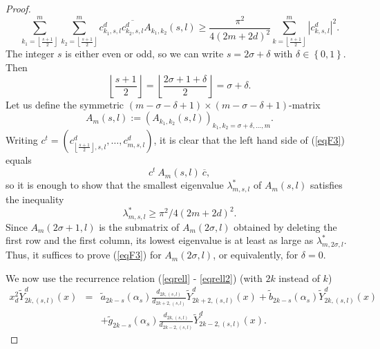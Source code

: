 \documentclass[10pt,a4paper]{amsart}
\begin{document}
\begin{proof}
\begin{equation}
\sum_{k_{1}=\left\lfloor \frac{s+1}{2}\right\rfloor }^{m}\sum_{k_{2}=\left\lfloor \frac{s+1}{2}%
\right\rfloor }^{m}c^d_{k_{1},s,l}\overline{c^d_{k_{2},s,l}}A_{k_{1},k_{2 }}\left(
s,l\right) 
\geq
 \frac{\pi ^{2}}{4\left( 2m + 2d  \right) ^{2}}\sum_{k=\left\lfloor 
\frac{s+1}{2}\right\rfloor }^{m}\left\vert c^d_{k,s,l}\right\vert ^{2}.  \label{eqF3}
\end{equation}
 The integer $s$ is either even or odd,
so we can write $s=2\sigma +\delta $ with $\delta \in \left\{ 0,1\right\}.$ 
Then 
\begin{equation*}
\left\lfloor \frac{s+1}{2}\right\rfloor =\left\lfloor \frac{2\sigma +1+\delta }{2}\right\rfloor
=\sigma +\delta .
\end{equation*}%
Let us define the symmetric $\left( m-\sigma -\delta +1\right) \times \left(
m-\sigma -\delta +1\right) $-matrix 
\begin{equation*}
A_{m}\left( s,l\right) :=\left( A_{k_{1},k_{2}}\left( s,l\right) \right)
_{k_{1},k_{2}=\sigma +\delta ,\dots , m}.
\end{equation*}
Writing $c^t = \left(c^d_{\left\lfloor \frac{s +1}{2}\right\rfloor, s,l}, \dots,  c^d_{m,s,l}\right)$, it is clear that the left hand side of (\ref{eqF3}) equals 
$$
c^t \ A_m(s,l) \ \overline{c},
$$
so it is enough to show that  the  smallest eigenvalue $\lambda _{m, s,l}^{\ast }$  of
 $A_m \left( s,l\right) $
satisfies the inequality 
$$
\lambda _{m, s,l}^{\ast }
\ge
\pi ^{2}/4\left( 2m+2d\right) ^{2}.
$$
Since $A_{m}\left( 2\sigma +1,l\right) $ is the submatrix of $A_{m}\left(
2\sigma ,l\right)$ obtained by deleting the first row and the first column, its lowest eigenvalue is at least as large as $\lambda _{m, 2\sigma,l}^{\ast }$. Thus, it suffices to prove (\ref{eqF3}) for $
A_{m}\left( 2\sigma ,l\right) $, or equivalently, for  $\delta =0.$



We now use the recurrence relation (\ref{eqrell} - \ref{eqrell2}) (with $2 k$ 
instead of  $k$)  
\begin{eqnarray*}
x_{d}^{2}\widetilde{Y}_{2k,\left( s,l\right) }^{d}\left( x\right) &=&%
\widetilde{a}_{2k-s}\left( \alpha _{s}\right) \frac{d_{2k,\left( s,l\right) }%
}{d_{2k+2,\left( s,l\right) }}\widetilde{Y}_{2k+2,\left( s,l\right)
}^{d}\left( x\right) +\widetilde{b}_{2k-s}\left( \alpha _{s}\right) 
\widetilde{Y}_{2k,\left( s,l\right) }^{d}\left( x\right) \\
&&+\widetilde{g}_{2k-s}\left( \alpha _{s}\right) \frac{d_{2k,\left(
s,l\right) }}{d_{2k-2,\left( s,l\right) }}\widetilde{Y}_{2k-2,\left(
s,l\right) }^{d}\left( x\right) .
\end{eqnarray*}


\end{proof}
\end{document}
